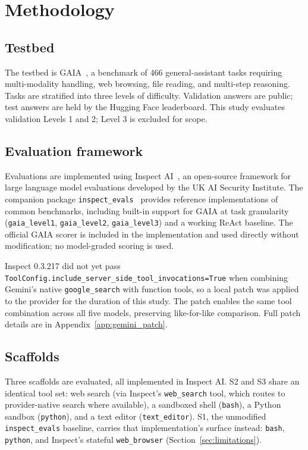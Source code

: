 \documentclass[10pt]{article} %
\begin{document}
\section{Methodology}

    \subsection{Testbed}\label{subsec:testbed}
        The testbed is GAIA~\citep{mialon2023gaia}, a benchmark of 466 general-assistant tasks requiring multi-modality handling, web browsing, file reading, and multi-step reasoning. Tasks are stratified into three levels of difficulty. Validation answers are public; test answers are held by the Hugging Face leaderboard. This study evaluates validation Levels 1 and 2; Level 3 is excluded for scope.
    
    \subsection{Evaluation framework}\label{subsec:framework}
    
        Evaluations are implemented using Inspect AI~\citep{aisi2024inspect}, an open-source framework for large language model evaluations developed by the UK AI Security Institute. The companion package \texttt{inspect\_evals}~\citep{aisi2024inspectevals} provides reference implementations of common benchmarks, including built-in support for GAIA at task granularity (\texttt{gaia\_level1}, \texttt{gaia\_level2}, \texttt{gaia\_level3}) and a working ReAct baseline. The official GAIA scorer is included in the implementation and used directly without modification; no model-graded scoring is used.
        
        Inspect 0.3.217 did not yet pass \texttt{ToolConfig.include\_server\_side\_tool\_invocations=True} when combining Gemini's native \texttt{google\_search} with function tools, so a local patch was applied to the provider for the duration of this study. The patch enables the same tool combination across all five models, preserving like-for-like comparison. Full patch details are in Appendix~\ref{app:gemini_patch}.
        
    \subsection{Scaffolds}\label{subsec:scaffolds}

        Three scaffolds are evaluated, all implemented in Inspect AI. S2 and S3 share an identical tool set: web search (via Inspect's \texttt{web\_search} tool, which routes to provider-native search where available), a sandboxed shell (\texttt{bash}), a Python sandbox (\texttt{python}), and a text editor (\texttt{text\_editor}). S1, the unmodified \texttt{inspect\_evals} baseline, carries that implementation's surface instead: \texttt{bash}, \texttt{python}, and Inspect's stateful \texttt{web\_browser} (Section~\ref{sec:limitations}).
        
\end{document}
